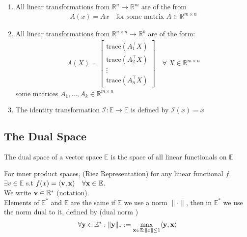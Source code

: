 \documentclass[11pt]{article}
\begin{document}
\begin{example}
    \begin{enumerate}
        \item All linear transformations from $\mathbb{R}^n \to \mathbb{R}^m$ are of the from
            \begin{align*}
                A(x) = Ax \quad \text{for some matrix } A \in \mathbb{R}^{m \times n}
            \end{align*}
        \item All linear transformations from $\mathbb{R}^{n \times n} \to \mathbb{R}^k$ are of the form:
            \begin{align*}
                A(X) = \begin{bmatrix} \text{trace}(A_{1}^\top X) \\ \text{trace}(A_{2}^\top X) \\ 
                                \vdots \\ \text{trace}(A_{n}^\top X) \end{bmatrix} \quad \forall \; X \in \mathbb{R}^{m \times n}
            \end{align*}
            some matrices $A_{1}, \ldots ,A_{k} \in \mathbb{R}^{m \times n}$
        \item The identity transformation $\mathcal{I}: \mathbb{E} \to \mathbb{E}$ is defined by $\mathcal{I}(x) = x$
    \end{enumerate}
\end{example}

\subsection{The Dual Space}
\begin{definition}
    The dual space of a vector space $\mathbb{E}$ is the space of all linear functionals on $\mathbb{E}$
\end{definition}

For inner product spaces, (Riez Representation) 
for any linear functional $f$, $\exists v \in \mathbb{E}$ s.t $f(x) = \langle {\mathbf{v}},{\mathbf{x}} \rangle
    \quad \forall {\mathbf{x}} \in \mathbb{E}$. \\
We write ${\mathbf{v}} \in \mathbb{E}^*$ (notation). \\
Elements of $\mathbb{E}^*$ and $\mathbb{E}$ are the same if $\mathbb{E}$ we use a norm $\| \cdot \| $,
then in $\mathbb{E}^*$ we use the norm dual to it, defined by (dual norm )
\begin{align*}
    \forall {\mathbf{y}} \in \mathbb{E}^*: \| {\mathbf{y}} \|_{*} := \max_{{\mathbf{x}} \in \mathbb{E}: \| x \| \le 1 } \langle {\mathbf{y}},{\mathbf{x}} \rangle
\end{align*}
\end{document}
